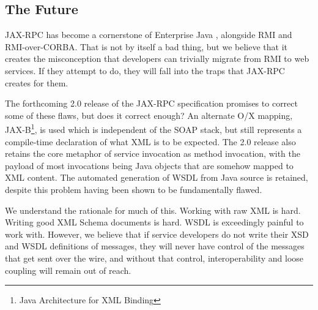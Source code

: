 
\subsection{The Future}
\label{implications:future}

JAX-RPC has become a cornerstone of Enterprise Java
\cite{spec:J2EE-14}, alongside RMI and RMI-over-CORBA. That is not by
itself a bad thing, but we believe that it creates the misconception
that developers can trivially migrate from RMI to web services. If
they attempt to do, they will fall into the traps that JAX-RPC creates
for them.

The forthcoming 2.0 release of the JAX-RPC specification promises to
correct some of these flaws, but does it correct enough? An alternate
O/X mapping, JAX-B\footnote{Java Architecture for XML Binding}, is
used which is independent of the SOAP stack, but still represents a
compile-time declaration of what XML is to be expected. The 2.0
release also retains the core metaphor of service invocation as method
invocation, with the payload of most invocations being Java objects
that are somehow mapped to XML content. The automated generation of
WSDL from Java source is retained, despite this problem having been
shown to be fundamentally flawed.

We understand the rationale for much of this. Working with raw XML is
hard.  Writing good XML Schema documents is hard. WSDL is exceedingly
painful to work with. However, we believe that if service developers
do not write their XSD and WSDL definitions of messages, they will
never have control of the messages that get sent over the wire, and
without that control, interoperability and loose coupling will remain
out of reach.  

